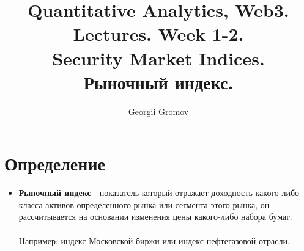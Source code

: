 \documentclass{article}
\title{Quantitative Analytics, Web3.\\
Lectures. Week 1-2. \\
Security Market Indices. \\
Рыночный индекс.}
\author{Georgii Gromov}
\begin{document}
\maketitle

\setcounter{tocdepth}{1} %
\renewcommand\contentsname{Contents}
\tableofcontents
\newpage




\renewcommand{\labelitemi}{\tiny$\bullet$}
\renewcommand{\figurename}{Fig.}

 \section{Определение}
 \begin{itemize}
     \item \textbf{Рыночный индекс} - показатель который отражает доходность какого-либо класса активов определенного рынка или сегмента этого рынка, он рассчитывается на основании изменения цены какого-либо набора бумаг. \\\\
    Например: индекс Московской биржи или индекс нефтегазовой отрасли.

 \end{itemize}
\end{document}
